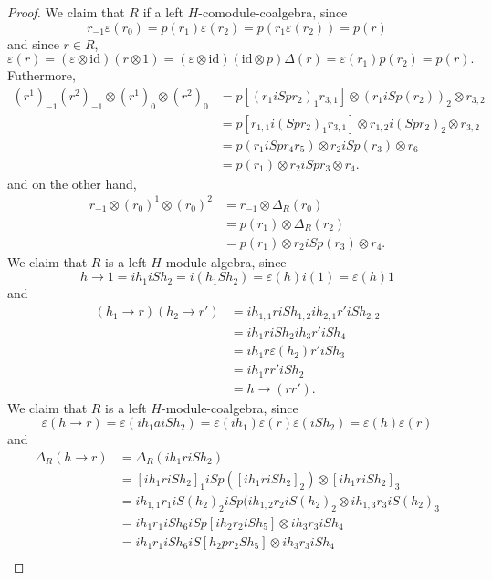 \begin{proof}
We claim that $R$ if a left $H$-comodule-coalgebra, since \[
r_{-1}\varepsilon(r_{0})=p(r_{1})\varepsilon(r_{2})=p(r_{1}\varepsilon(r_{2}))=p(r)\]
and since $r\in R$, \[
\varepsilon(r)=(\varepsilon\otimes\textrm{id})(r\otimes1)=(\varepsilon\otimes\textrm{id})(\textrm{id}\otimes p)\Delta(r)=\varepsilon(r_{1})p(r_{2})=p(r).\]
Futhermore, \begin{align*}
(r^{1})_{-1}(r^{2})_{-1}\otimes(r^{1})_{0}\otimes(r^{2})_{0} & =p[(r_{1}iSpr_{2})_{1}r_{3,1}]\otimes(r_{1}iSp(r_{2}))_{2}\otimes r_{3,2}\\
 & =p[r_{1,1}i(Spr_{2})_{1}r_{3,1}]\otimes r_{1,2}i(Spr_{2})_{2}\otimes r_{3,2}\\
 & =p(r_{1}iSpr_{4}r_{5})\otimes r_{2}iSp(r_{3})\otimes r_{6}\\
 & =p(r_{1})\otimes r_{2}iSpr_{3}\otimes r_{4}.\end{align*}
and on the other hand,\begin{align*}
r_{-1}\otimes(r_{0})^{1}\otimes(r_{0})^{2} & =r_{-1}\otimes\Delta_{R}(r_{0})\\
 & =p(r_{1})\otimes\Delta_{R}(r_{2})\\
 & =p(r_{1})\otimes r_{2}iSp(r_{3})\otimes r_{4}.
\end{align*}
We claim that $R$ is a left $H$-module-algebra, since 
\[
h\to1=ih_{1}iSh_{2}=i(h_{1}Sh_{2})=\varepsilon(h)i(1)=\varepsilon(h)1
\]
and 
\begin{align*}
(h_{1}\to r)(h_{2}\to r') & =ih_{1,1}riSh_{1,2}ih_{2,1}r'iSh_{2,2}\\
 & =ih_{1}riSh_{2}ih_{3}r'iSh_{4}\\
 & =ih_{1}r\varepsilon(h_{2})r'iSh_{3}\\
 & =ih_{1}rr'iSh_{2}\\
 & =h\to(rr').
\end{align*}
We claim that $R$ is a left $H$-module-coalgebra, since \[
\varepsilon(h\to r)=\varepsilon(ih_{1}aiSh_{2})=\varepsilon(ih_{1})\varepsilon(r)\varepsilon(iSh_{2})=\varepsilon(h)\varepsilon(r)\]
and \begin{align*}
\Delta_{R}(h\to r) & =\Delta_{R}(ih_{1}riSh_{2})\\
 & =[ih_{1}riSh_{2}]_{1}iSp([ih_{1}riSh_{2}]_{2})\otimes[ih_{1}riSh_{2}]_{3}\\
 & =ih_{1,1}r_{1}iS(h_{2})_{2}iSp(ih_{1,2}r_{2}iS(h_{2})_{2}\otimes ih_{1,3}r_{3}iS(h_{2})_{3}\\
 & =ih_{1}r_{1}iSh_{6}iSp[ih_{2}r_{2}iSh_{5}]\otimes ih_{3}r_{3}iSh_{4}\\
 & =ih_{1}r_{1}iSh_{6}iS[h_{2}pr_{2}Sh_{5}]\otimes ih_{3}r_{3}iSh_{4}\\

\end{align*}
\end{proof}
